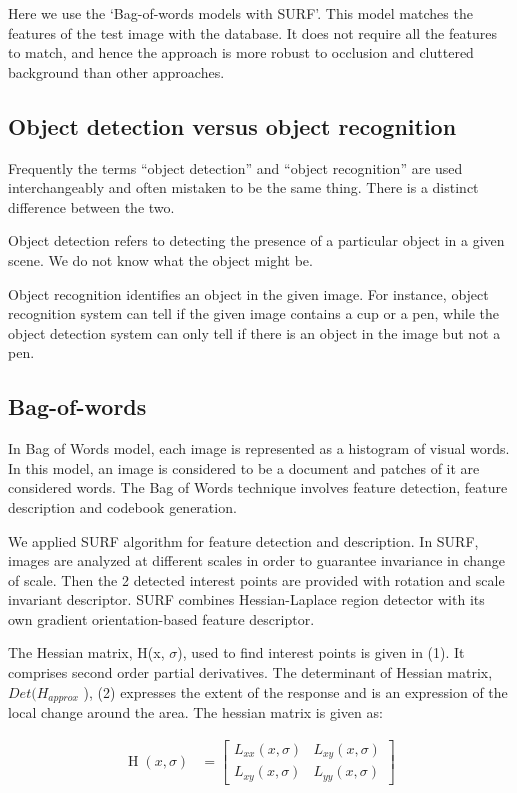 \documentclass[journal,twoside]{IEEEtran}
\DeclareMathOperator{\Hessian}{H}
\begin{document}
Here we use the ‘Bag-of-words models with SURF’. This
model matches the features of the test image with the
database. It does not require all the features to match, and
hence the approach is more robust to occlusion and cluttered
background than other approaches.

\subsection{Object detection versus object recognition}

Frequently the terms “object detection” and “object
recognition” are used interchangeably and often mistaken to
be the same thing. There is a distinct difference between the two.

Object detection refers to detecting the presence of a
particular object in a given scene. We do not know what the
object might be.

Object recognition identifies an object in the given image.
For instance, object recognition system can tell if the given
image contains a cup or a pen, while the object detection
system can only tell if there is an object in the image but not a
pen.

\subsection{Bag-of-words}

In Bag of Words model, each image is represented as a
histogram of visual words. In this model, an image is
considered to be a document and patches of it are considered
words. The Bag of Words technique involves feature
detection, feature description and codebook generation. \cite{Grauman2011}

We applied SURF algorithm for feature detection and
description. In SURF, images are analyzed at different scales
in order to guarantee invariance in change of scale. Then the 2
detected interest points are provided with rotation and scale
invariant descriptor. SURF combines Hessian-Laplace 
region detector with its own gradient orientation-based feature
descriptor. \cite{Bay2006}

The Hessian matrix, H(x, \(\sigma\)), used to find interest points is
given in (1). It comprises second order partial derivatives. The
determinant of Hessian matrix, \(Det(H_{approx}\) ), (2) expresses
the extent of the response and is an expression of the local
change around the area. The hessian matrix is given as:

    \begin{align}
        \Hessian\left( x,\sigma \right) &= 
        \begin{bmatrix}
            L_{xx}\left( x,\sigma \right) & L_{xy}\left( x,\sigma\right) \\
            L_{xy}\left( x,\sigma\right) & L_{yy}\left( x,\sigma\right)
        \end{bmatrix}
    \end{align}
\end{document}
